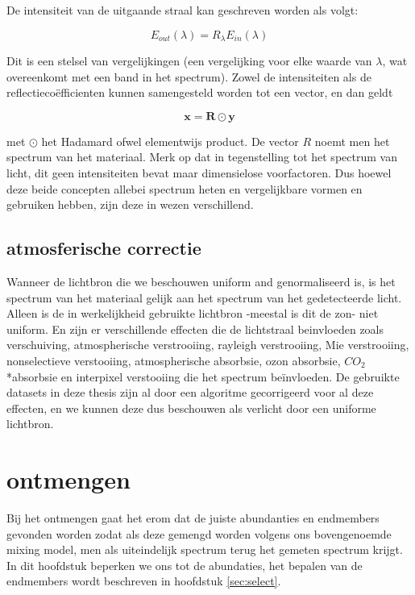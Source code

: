 \documentclass[12pt]{report}
\begin{document}
De intensiteit van de uitgaande straal kan geschreven worden als volgt:

\begin{equation}
E_{out}(\lambda) = R_\lambda E_{in}(\lambda)
\end{equation}

Dit is een stelsel van vergelijkingen (een vergelijking voor elke waarde van $\lambda$, wat overeenkomt met een band in het spectrum). Zowel de intensiteiten als de reflectieco\"efficienten kunnen samengesteld worden tot een vector, en dan geldt

\begin{equation}
\bm{x} = \bm{R}\odot \bm{y}
\end{equation}

met $\odot$ het Hadamard ofwel elementwijs product. De vector $R$ noemt men het spectrum van het materiaal. Merk op dat in tegenstelling tot het spectrum van licht, dit geen intensiteiten bevat maar dimensielose voorfactoren. Dus hoewel deze beide concepten allebei spectrum heten en vergelijkbare vormen en gebruiken hebben, zijn deze in wezen verschillend.


\subsection{atmosferische correctie}

Wanneer de lichtbron die we beschouwen uniform and genormaliseerd is, is het spectrum van het materiaal gelijk aan het spectrum van het gedetecteerde licht. Alleen is de in werkelijkheid gebruikte lichtbron -meestal is dit de zon- niet uniform. En zijn er verschillende effecten die de lichtstraal beinvloeden\cite{fun} zoals verschuiving, atmospherische verstrooiing, rayleigh verstrooiing, Mie verstrooiing, nonselectieve verstooiing, atmospherische absorbsie, ozon absorbsie, $CO_2$*absorbsie en interpixel verstooiing die het spectrum be\"invloeden. De gebruikte datasets in deze thesis zijn al door een algoritme gecorrigeerd voor al deze effecten, en we kunnen deze dus beschouwen als verlicht door een uniforme lichtbron.

\section{ontmengen}

Bij het ontmengen gaat het erom dat de juiste abundanties en endmembers gevonden worden zodat als deze gemengd worden volgens ons bovengenoemde mixing model, men als uiteindelijk spectrum terug het gemeten spectrum krijgt. In dit hoofdstuk beperken we ons tot de abundaties, het bepalen van de endmembers wordt beschreven in hoofdstuk \ref{sec:select}.
\end{document}
